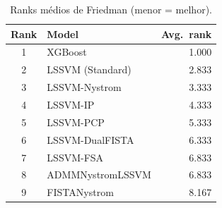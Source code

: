 \begin{table}[ht]
  \centering
  \caption{Ranks médios de Friedman (menor = melhor).}
  \label{tab:ranks}
  \begin{tabular}{clr}
    \toprule
    Rank & Model & Avg.\ rank \\
    \midrule
1 & XGBoost & 1.000 \\
2 & LSSVM (Standard) & 2.833 \\
3 & LSSVM-Nystrom & 3.333 \\
4 & LSSVM-IP & 4.333 \\
5 & LSSVM-PCP & 5.333 \\
6 & LSSVM-DualFISTA & 6.333 \\
7 & LSSVM-FSA & 6.833 \\
8 & ADMMNystromLSSVM & 6.833 \\
9 & FISTANystrom & 8.167 \\
    \bottomrule
  \end{tabular}
\end{table}